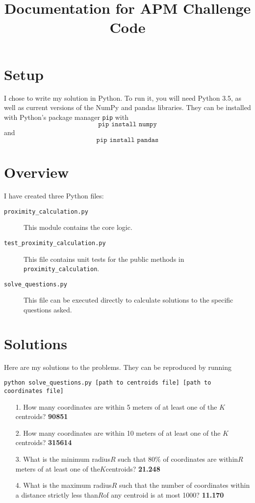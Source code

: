 \documentclass{amsart}
\theoremstyle{definition}
\theoremstyle{definition}
\begin{document}
\title[Documentation for APM Challenge Code]{Documentation for APM Challenge Code}

\date{}

\maketitle

\section{Setup}
I chose to write my solution in Python.  To run it, you will need Python 3.5, as well as current versions of the NumPy and pandas libraries.  They can be installed with Python's package manager \texttt{pip} with
\[
\texttt{pip install numpy}
\]
and
\[
\texttt{pip install pandas}
\]

\section{Overview}
I have created three Python files:
\begin{description}
\item[\texttt{proximity\_calculation.py}] This module contains the core logic.
\item[\texttt{test\_proximity\_calculation.py}] This file contains unit tests for the public methods in \texttt{proximity\_calculation}.
\item[\texttt{solve\_questions.py}] This file can be executed directly to calculate solutions to the specific questions asked.
\end{description}

\section{Solutions}
Here are my solutions to the problems.  They can be reproduced by running
\begin{center}
  \texttt{python solve\_questions.py [path to centroids file] [path to coordinates file]}
\end{center}
\begin{itemize}
  \item[1.] How many coordinates are within 5 meters of at least one of the ​
    $K$ ​centroids? \textbf{90851}
  \item[2.] How many coordinates are within 10 meters of at least one of the ​
    $K$ ​centroids? \textbf{315614}
  \item[3.] What is the minimum radius ​$R$ such that 80\% of coordinates are within ​$R$ ​meters of at least one of the ​$K$ ​centroids? \textbf{21.248}
  \item[4.] What is the maximum radius ​$R$ such that the number of coordinates within a distance strictly less than ​$R$ ​of any centroid is at most 1000? \textbf{11.170}
\end{itemize}
\end{document}
